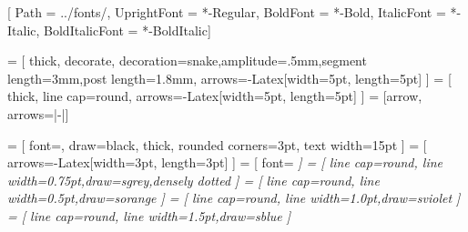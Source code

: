 \usepackage{tikz}
\usepackage{fontawesome5}
\usepackage{fontspec}
\usepackage{color}
\usepackage{csquotes}
\usepackage{xspace}
\RequirePackage[scaled=.9]{FiraMono}
\usetikzlibrary{
    calc,
    arrows.meta,
    decorations.pathmorphing,
    positioning,
    shapes.geometric,
    tikzmark
}


\setmainfont{TeXGyreTermes}[
    Path = ../fonts/,
    UprightFont = *-Regular,
    BoldFont = *-Bold,
    ItalicFont = *-Italic,
    BoldItalicFont = *-BoldItalic]

 = [
  thick, decorate,
  decoration={snake,amplitude=.5mm,segment length=3mm,post length=1.8mm},
  arrows={-Latex[width=5pt, length=5pt]}
]
  = [
  thick, line cap=round,
  arrows={-Latex[width=5pt, length=5pt]}
]
  = [arrow, arrows={|-|}]

 = [
    font=\ttfamily\small, draw=black, thick,
    rounded corners=3pt, text width=15pt
]
 = [
    arrows={-Latex[width=3pt, length=3pt]}
]
 = [
    font=\itshape\scriptsize\color{gray!50!black}
]
 = [
    line cap=round, line width=0.75pt,draw=sgrey,densely dotted
]
 = [
    line cap=round, line width=0.5pt,draw=sorange
]
 = [
    line cap=round, line width=1.0pt,draw=sviolet
]
 = [
    line cap=round, line width=1.5pt,draw=sblue
]